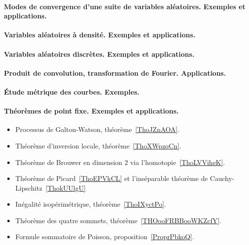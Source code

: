 \paragraph{Modes de convergence d’une suite de variables aléatoires. Exemples et applications.}
\paragraph{Variables aléatoires à densité. Exemples et applications.}
\paragraph{Variables aléatoires discrètes. Exemples et applications.}
\paragraph{Produit de convolution, transformation de Fourier. Applications.}
\paragraph{Étude métrique des courbes. Exemples.}
\paragraph{Théorèmes de point fixe. Exemples et applications.}
\begin{itemize}
    \item Processus de Galton-Watson, théorème~\ref{ThoJZnAOA}.
    \item Théorème d'inversion locale, théorème~\ref{ThoXWpzqCn}.
    \item Théorème de Brouwer en dimension \( 2\) via l'homotopie~\ref{ThoLVViheK}.
    \item Théorème de Picard~\ref{ThoEPVkCL} et l'inséparable théorème de Cauchy-Lipschitz~\ref{ThokUUlgU}
\end{itemize}
\begin{itemize}
    \item Inégalité isopérimétrique, théorème~\ref{ThoIXyctPo}.
    \item Théorème des quatre sommets, théorème~\ref{THOooFRBBooWKZcfY}.
\end{itemize}
\begin{itemize}
    \item Formule sommatoire de Poisson, proposition~\ref{ProprPbkoQ}.
\end{itemize}
